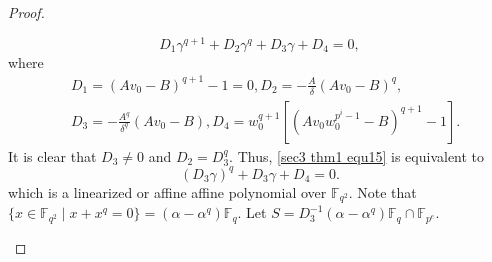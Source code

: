 \documentclass[sn-mathphys-num]{sn-jnl}%
\theoremstyle{thmstyleone}%
\theoremstyle{thmstyletwo}%
\theoremstyle{thmstylethree}%
\begin{document}
\begin{proof}
\begin{enumerate}[label = \bf Case \arabic*:, leftmargin=4.1em]
\begin{enumerate}[label=\bf Case 3.\arabic*:]
			\begin{equation*}
				D_1\gamma^{q+1}+D_2\gamma^q+D_3\gamma+D_4=0,
			\end{equation*}
			where
			\begin{equation*}
				\begin{aligned}
					&D_1=(Av_0-B)^{q+1}-1=0, D_2=-\frac{A}{\delta}(Av_0-B)^q,\\
					&D_3=-\frac{A^q}{\delta^q}(Av_0-B),D_4=w_0^{q+1}\left[(Av_0w_0^{p^i-1}-B)^{q+1}-1\right].
				\end{aligned}
			\end{equation*}
			It is clear that $D_3 \ne 0$ and $D_2=D_3^q$. Thus, \cref{sec3 thm1 equ15} is equivalent to
			\begin{equation}
				\label{sec3 thm1 equ16}
				(D_3\gamma)^q+D_3\gamma+D_4=0.
			\end{equation}
			which is a linearized or affine affine polynomial over $\mathbb{F}_{q^2}$. Note that $\{x\in \mathbb{F}_{q^2} \mid x+x^q=0\}=(\alpha-\alpha^q)\mathbb{F}_q$. Let $S=D_3^{-1}(\alpha-\alpha^q)\mathbb{F}_q \cap \mathbb{F}_{p^e}$. 
			

\end{enumerate}
\end{enumerate}
\end{proof}
\end{document}

